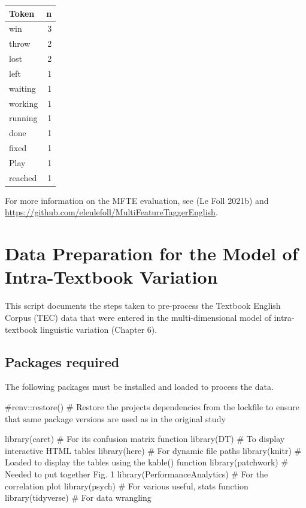 \documentclass[
  letterpaper,
  DIV=11,
  numbers=noendperiod]{scrreprt}
\newenvironment{Shaded}{\begin{snugshade}}{\end{snugshade}}
\newcommand{\CommentTok}[1]{\textcolor[rgb]{0.37,0.37,0.37}{#1}}
\newcommand{\FunctionTok}[1]{\textcolor[rgb]{0.28,0.35,0.67}{#1}}
\newcommand{\NormalTok}[1]{\textcolor[rgb]{0.00,0.23,0.31}{#1}}
\begin{document}
\begin{longtable}[]{@{}lr@{}}
\toprule\noalign{}
Token & n \\
\midrule\noalign{}
\endhead
\bottomrule\noalign{}
\endlastfoot
win & 3 \\
throw & 2 \\
lost & 2 \\
left & 1 \\
waiting & 1 \\
working & 1 \\
running & 1 \\
done & 1 \\
fixed & 1 \\
Play & 1 \\
reached & 1 \\
\end{longtable}

For more information on the MFTE evaluation, see (Le Foll 2021b) and
\url{https://github.com/elenlefoll/MultiFeatureTaggerEnglish}.

\chapter{Data Preparation for the Model of Intra-Textbook
Variation}\label{data-preparation-for-the-model-of-intra-textbook-variation}

This script documents the steps taken to pre-process the Textbook
English Corpus (TEC) data that were entered in the multi-dimensional
model of intra-textbook linguistic variation (Chapter 6).

\section{Packages required}\label{packages-required-1}

The following packages must be installed and loaded to process the data.

\begin{Shaded}
\begin{Highlighting}[]
\CommentTok{\#renv::restore() \# Restore the project\textquotesingle{}s dependencies from the lockfile to ensure that same package versions are used as in the original study}

\FunctionTok{library}\NormalTok{(caret) }\CommentTok{\# For its confusion matrix function}
\FunctionTok{library}\NormalTok{(DT) }\CommentTok{\# To display interactive HTML tables}
\FunctionTok{library}\NormalTok{(here) }\CommentTok{\# For dynamic file paths}
\FunctionTok{library}\NormalTok{(knitr) }\CommentTok{\# Loaded to display the tables using the kable() function}
\FunctionTok{library}\NormalTok{(patchwork) }\CommentTok{\# Needed to put together Fig. 1}
\FunctionTok{library}\NormalTok{(PerformanceAnalytics) }\CommentTok{\# For the correlation plot}
\FunctionTok{library}\NormalTok{(psych) }\CommentTok{\# For various useful, stats function}
\FunctionTok{library}\NormalTok{(tidyverse) }\CommentTok{\# For data wrangling}
\end{Highlighting}
\end{Shaded}
\end{document}
